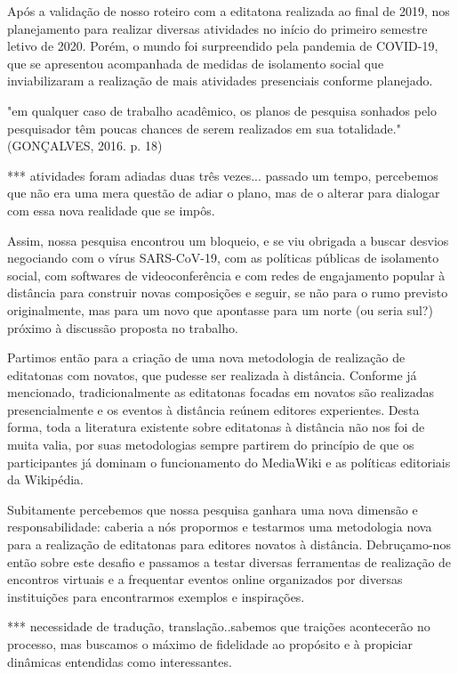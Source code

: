 Após a validação de nosso roteiro com a editatona realizada ao final de 2019, nos planejamento para realizar diversas atividades no início do primeiro semestre letivo de 2020. Porém, o mundo foi surpreendido pela pandemia de COVID-19, que se apresentou acompanhada de medidas de isolamento social que inviabilizaram a realização de mais atividades presenciais conforme planejado.

"em qualquer caso de trabalho acadêmico, os planos de pesquisa sonhados pelo pesquisador têm poucas chances de serem realizados em sua totalidade." (GONÇALVES, 2016. p. 18)

*** atividades foram adiadas duas três vezes... passado um tempo, percebemos que não era uma mera questão de adiar o plano, mas de o alterar para dialogar com essa nova realidade que se impôs.

Assim, nossa pesquisa encontrou um bloqueio, e se viu obrigada a buscar desvios negociando com o vírus SARS-CoV-19, com as políticas públicas de isolamento social, com softwares de videoconferência e com redes de engajamento popular à distância para construir novas composições e seguir, se não para o rumo previsto originalmente, mas para um novo que apontasse para um norte (ou seria sul?) próximo à discussão proposta no trabalho.

Partimos então para a criação de uma nova metodologia de realização de editatonas com novatos, que pudesse ser realizada à distância. Conforme já mencionado, tradicionalmente as editatonas focadas em novatos são realizadas presencialmente e os eventos à distância reúnem editores experientes. Desta forma, toda a literatura existente sobre editatonas à distância não nos foi de muita valia, por suas metodologias sempre partirem do princípio de que os participantes já dominam o funcionamento do MediaWiki e as políticas editoriais da Wikipédia.

Subitamente percebemos que nossa pesquisa ganhara uma nova dimensão e responsabilidade: caberia a nós propormos e testarmos uma metodologia nova para a realização de editatonas para editores novatos à distância. Debruçamo-nos então sobre este desafio e passamos a testar diversas ferramentas de realização de encontros virtuais e a frequentar eventos online organizados por diversas instituições para encontrarmos exemplos e inspirações.

*** necessidade de tradução, translação..sabemos que traições acontecerão no processo, mas buscamos o máximo de fidelidade ao propósito e à propiciar dinâmicas entendidas como interessantes.

